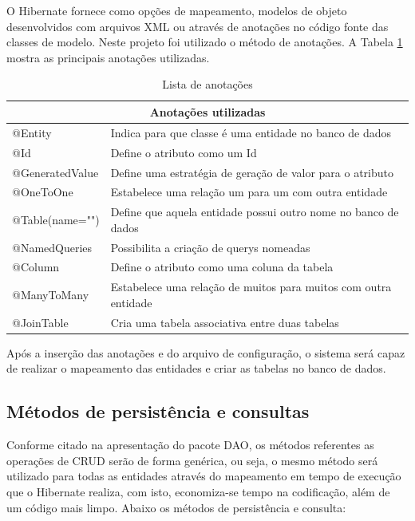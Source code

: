    
    O Hibernate fornece como opções de mapeamento, modelos de objeto desenvolvidos com arquivos XML ou através de anotações no código fonte das classes de modelo. Neste projeto foi utilizado o método de anotações. A Tabela \ref{tab:anotacoes} mostra as principais anotações utilizadas.

\begin{table}[H]
\caption{Lista de anotações}
\label{tab:anotacoes}
\begin{tabular}{ll}
\hline
\multicolumn{2}{c}{Anotações utilizadas}                                        \\ \hline
@Entity         & Indica para que classe é uma entidade no banco de dados         \\ \hline
@Id             & Define o atributo como um Id                                    \\ \hline
@GeneratedValue & Define uma estratégia de geração de valor para o atributo       \\ \hline
@OneToOne       & Estabelece uma relação um para um com outra entidade            \\ \hline
@Table(name="") & Define que aquela entidade possui outro nome no banco de dados  \\ \hline
@NamedQueries   & Possibilita a criação de querys nomeadas                        \\ \hline
@Column         & Define o atributo como uma coluna da tabela                     \\ \hline
@ManyToMany     & Estabelece uma relação de muitos para muitos com outra entidade \\ \hline
@JoinTable      & Cria uma tabela associativa entre duas tabelas                  \\ \hline
\end{tabular}
\end{table}
 
 Após a inserção das anotações e do arquivo de configuração, o sistema será capaz de realizar o mapeamento das entidades e criar as tabelas no banco de dados.
    
    
  \subsection{Métodos de persistência e consultas}
    Conforme citado na apresentação do pacote DAO, os métodos referentes as operações de CRUD serão de forma genérica, ou seja, o mesmo método será utilizado para todas as entidades através do mapeamento em tempo de execução que o Hibernate realiza, com isto, economiza-se tempo na codificação, além de um código mais limpo. Abaixo os métodos de persistência e consulta:
    
